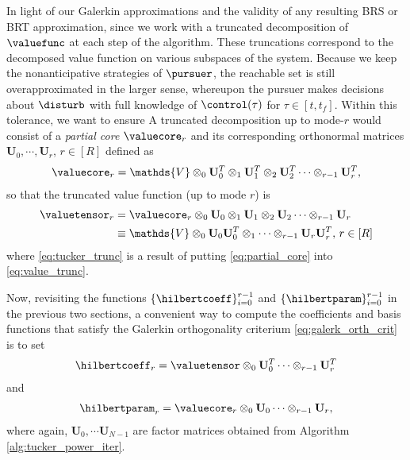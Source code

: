 In light of our Galerkin approximations and the validity of any resulting BRS or BRT approximation, since we work with a truncated decomposition of $\valuefunc$ at each step of the algorithm. These truncations correspond to the  decomposed value function on various subspaces of the system. Because we keep the nonanticipative  strategies of $\pursuer$, the reachable set is still overapproximated in the larger sense, whereupon the pursuer makes decisions about $\disturb$ with full knowledge of $\control(\tau)$ for $\tau \in \left[t, t_f\right]$. Within this tolerance, we want to ensure  A truncated decomposition up to mode-$r$ would consist of a \textit{partial core} $\valuecore_r$ and its corresponding orthonormal matrices $\bm{U}_0, \cdots, \bm{U}_r$, $r \in \left[R \right]$ defined as 
%
\begin{align}
	\valuecore_r = \mathds{V} \otimes_0  \mathbf{U}_0^T \otimes_1 \mathbf{U}_1^T \otimes_2 \mathbf{U}_2^T \cdots \otimes_{r-1} \mathbf{U}_{r}^T,
	\label{eq:partial_core}
\end{align}
%
so that the truncated value function (up to mode $r$) is 
%
\begin{subequations}
	\begin{align}
		\valuetensor_r &= \valuecore_r \otimes_0 \mathbf{U}_0 \otimes_1 \mathbf{U}_1 \otimes_2 \mathbf{U}_2 \cdots \otimes_{r-1} \mathbf{U}_{r} \label{eq:value_trunc} \\
		&\equiv  \mathds{V} \otimes_0  \mathbf{U}_0\mathbf{U}_0^T \otimes_1  \cdots \otimes_{r-1} \mathbf{U}_{r}\mathbf{U}_r^T, \, r \in \left[R\right]
		\label{eq:tucker_trunc} 
	\end{align}
\end{subequations}
%
where \eqref{eq:tucker_trunc} is a result of putting \eqref{eq:partial_core} into \eqref{eq:value_trunc}.  

Now, revisiting the functions $\{\hilbertcoeff\}_{i=0}^{r-1}$ and $\{\hilbertparam\}_{i=0}^{r-1}$ in the previous two sections, a convenient way to compute the coefficients and basis functions that satisfy the Galerkin orthogonality criterium \eqref{eq:galerk_orth_crit} is to set 
%
\begin{align}
	\hilbertcoeff_r = \valuetensor \otimes_0 \mathbf{U}_0^T \cdots \otimes_{r-1} \mathbf{U}_r^T
	\label{eq:hilbert_coeff_compute}
\end{align}
%
and 
%
\begin{align}
	\hilbertparam_r = \valuecore_{r} \otimes_0 \mathbf{U}_0 \cdots \otimes_{r-1} \mathbf{U}_r,
	\label{eq:hilbert_basis_compute}
\end{align}
%
where again, $\mathbf{U}_0, \cdots \mathbf{U}_{N-1}$ are factor matrices obtained from Algorithm \ref{alg:tucker_power_iter}.

